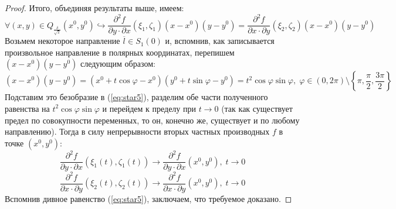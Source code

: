 \documentclass[11pt]{article}
\begin{document}
\begin{proof}
    Итого, объединяя результаты выше, имеем:
    \begin{equation} \label{eq:star5}
        \forall (x, y) \in Q_{\frac{\delta}{\sqrt{2}}}\left(x^0, y^0\right) \hookrightarrow 
    \frac{\partial^2 f}{\partial y \cdot \partial x}(\xi_1, \zeta_1)\left(x - x^0\right)\left(y - y^0\right) =
    \frac{\partial^2 f}{\partial x \cdot \partial y}(\xi_2, \zeta_2)\left(x - x^0\right)\left(y - y^0\right)
    \end{equation}
    Возьмем некоторое направление $\overline{l} \in S_1(0)$ и, вспомнив, как записывается произвольное направление в полярных координатах, перепишем $\left(x - x^0\right)\left(y - y^0\right)$ следующим образом: 
    \[\left(x - x^0\right)\left(y - y^0\right) = \left(x^0 + t \cos \varphi - x^0 \right) \left(y^0 + t \sin \varphi - y^0 \right) = t^2 \cos \varphi \sin \varphi, \; \varphi \in (0, 2 \pi) \setminus \left\{\pi, \frac{\pi}{2}, \frac{3 \pi}{2}\right\}\]
    Подставим это безобразие в (\ref{eq:star5}), разделим обе части полученного равенства на $t^2 \cos \varphi \sin \varphi$ и перейдем к пределу при $t \to 0$ (так как существует предел по совокупности переменных, то он, конечно же, существует и по любому направлению).
    Тогда в силу непрерывности вторых частных производных $f$ в точке $\left(x^0, y^0\right)$:
    \[\frac{\partial^2 f}{\partial y \cdot \partial x}(\xi_1(t), \zeta_1(t)) \to \frac{\partial^2 f}{\partial y \cdot \partial x}\left(x^0, y^0\right), \; t \to 0\] 
    \[\frac{\partial^2 f}{\partial x \cdot \partial y}(\xi_2(t), \zeta_2(t)) \to \frac{\partial^2 f}{\partial x \cdot \partial y}\left(x^0, y^0\right), \; t \to 0\]
    Вспомнив дивное равенство (\ref{eq:star5}), заключаем, что требуемое доказано.
\end{proof}
\end{document}

